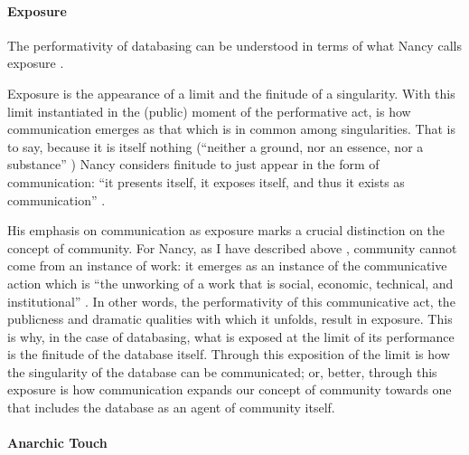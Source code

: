 
\paragraph{Exposure}
The performativity of databasing can be understood in terms of what Nancy calls exposure \parencite{Nan91:The}. 


Exposure is the appearance of a limit and the finitude of a singularity. With this limit instantiated in the (public) moment of the performative act, is how communication emerges as that which is in common among singularities. That is to say, because it is itself nothing (``neither a ground, nor an essence, nor a substance'' \parencite[31]{Nan91:The}) Nancy considers finitude to just appear in the form of communication: ``it presents itself, it exposes itself, and thus it exists as communication'' \parencite[31]{Nan91:The}. 


His emphasis on communication as exposure marks a crucial distinction on the concept of community. For Nancy, as I have described above , community cannot come from an instance of work: it emerges as an instance of the communicative action which is ``the unworking of a work that is social, economic, technical, and institutional'' \parencite[31]{Nan91:The}. In other words, the performativity of this communicative act, the publicness and dramatic qualities with which it unfolds, result in exposure. This is why, in the case of databasing, what is exposed at the limit of its performance is the finitude of the database itself. Through this exposition of the limit is how the singularity of the database can be communicated; or, better, through this exposure is how communication expands our concept of community towards one that includes the database as an agent of community itself.

\paragraph{Anarchic Touch}

